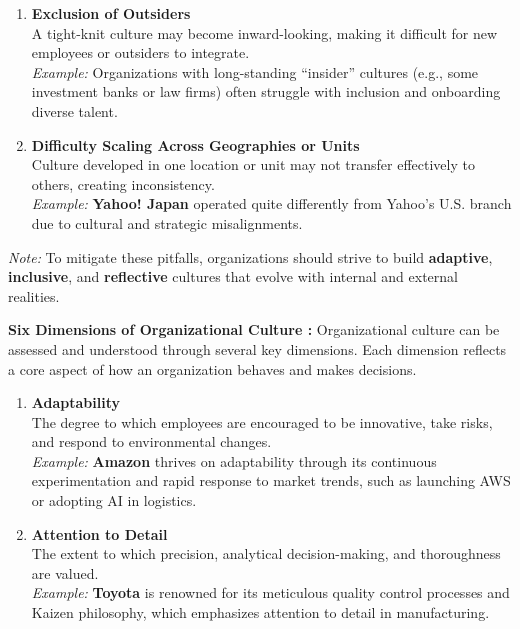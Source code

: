 \documentclass[10pt,a4paper]{book}
\begin{document}
\begin{multicols}{2}
\begin{enumerate}
    \item \textbf{Exclusion of Outsiders} \\
    A tight-knit culture may become inward-looking, making it difficult for new employees or outsiders to integrate.\\
    \textit{Example:} Organizations with long-standing “insider” cultures (e.g., some investment banks or law firms) often struggle with inclusion and onboarding diverse talent.

    \item \textbf{Difficulty Scaling Across Geographies or Units} \\
    Culture developed in one location or unit may not transfer effectively to others, creating inconsistency.\\
    \textit{Example:} \textbf{Yahoo! Japan} operated quite differently from Yahoo’s U.S. branch due to cultural and strategic misalignments.

\end{enumerate}

\textit{Note:} To mitigate these pitfalls, organizations should strive to build \textbf{adaptive}, \textbf{inclusive}, and \textbf{reflective} cultures that evolve with internal and external realities.

\vspace{0.5cm}

\textbf{Six Dimensions of Organizational Culture :}
Organizational culture can be assessed and understood through several key dimensions. Each dimension reflects a core aspect of how an organization behaves and makes decisions.

\begin{enumerate}
    \item \textbf{Adaptability} \\
    The degree to which employees are encouraged to be innovative, take risks, and respond to environmental changes. \\
    \textit{Example:} \textbf{Amazon} thrives on adaptability through its continuous experimentation and rapid response to market trends, such as launching AWS or adopting AI in logistics.

    \item \textbf{Attention to Detail} \\
    The extent to which precision, analytical decision-making, and thoroughness are valued.\\
    \textit{Example:} \textbf{Toyota} is renowned for its meticulous quality control processes and Kaizen philosophy, which emphasizes attention to detail in manufacturing.


\end{enumerate}
\end{multicols}
\end{document}
